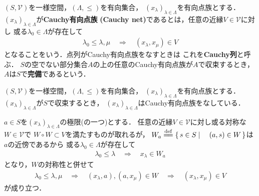 	\begin{screen}
		\begin{dfn}
			$(S,\mathscr{V})$を一様空間，$(\Lambda,\leq)$を有向集合，
			$(x_\lambda)_{\lambda \in \Lambda}$を有向点族とする．
			$(x_\lambda)_{\lambda \in \Lambda}$が{\bf Cauchy有向点族}
			{\bf (Cauchy net)}であるとは，任意の近縁$V \in \mathscr{V}$に対し
			或る$\lambda_0 \in \Lambda$が存在して
			\begin{align}
				\lambda_0 \leq \lambda,\mu
				\quad \Longrightarrow \quad
				(x_\lambda,x_\mu) \in V
			\end{align}
			となることをいう．点列がCauchy有向点族をなすときは
			これを{\bf Cauchy列}と呼ぶ．
			$S$の空でない部分集合$A$の上の任意のCauchy有向点族が$A$で収束するとき，
			$A$は$S$で{\bf 完備}であるという．
		\end{dfn}
	\end{screen}
	
	\begin{screen}
		\begin{thm}[収束する有向点族はCauchy有向点族]\label{thm:convergent_net_is_Cauchy}
			$(S,\mathscr{V})$を一様空間，$(\Lambda,\leq)$を有向集合，
			$(x_\lambda)_{\lambda \in \Lambda}$を有向点族とする．
			$(x_\lambda)_{\lambda \in \Lambda}$が$S$で収束するとき，
			$(x_\lambda)_{\lambda \in \Lambda}$はCauchy有向点族をなしている．
		\end{thm}
	\end{screen}
	
	\begin{prf}
		$a \in S$を$(x_\lambda)_{\lambda \in \Lambda}$の極限(の一つ)とする．
		任意の近縁$V \in \mathscr{V}$に対し或る対称な$W \in \mathscr{V}$で
		$W \circ W \subset V$を満たすものが取れるが，
		$W_a \defeq \Set{s \in S}{(a,s) \in W}$は$a$の近傍であるから
		或る$\lambda_0 \in \Lambda$が存在して
		\begin{align}
			\lambda_0 \leq \lambda \quad \Longrightarrow \quad
			x_\lambda \in W_a
		\end{align}
		となり，$W$の対称性と併せて
		\begin{align}
			\lambda_0 \leq \lambda,\mu \quad \Longrightarrow \quad
			(x_\lambda,a),(a,x_\mu) \in W \quad \Longrightarrow \quad
			(x_\lambda,x_\mu) \in V
		\end{align}
		が成り立つ．
		\QED
	\end{prf}
	
